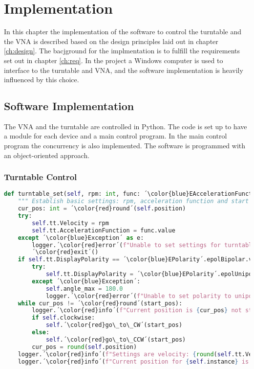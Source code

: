 \chapter{Implementation} \label{ch:implementation}
In this chapter the implementation of the software to control the turntable and the VNA is described based on the design principles laid out in chapter \ref{ch:design}. The bacjground for the implmentation is to fulfill the requirements set out in chapter \ref{ch:req}. In the project a Windows computer is used to interface to the turntable and VNA, and the software implementation is heavily influenced by this choice.

\section{Software Implementation}
The VNA and the turntable are controlled in Python. The code is set up to have a module for each device and a main control program. In the main control program the concurrency is also implemented. The software is programmed with an object-oriented approach.

\subsection{Turntable Control}


\begin{lstlisting}[language=Python, caption=Method to establish settings for turntable and reach start position.]
def turntable_set(self, rpm: int, func: ´\color{blue}EAccelerationFunction´, start_pos: float) -> None:
    """ Establish basic settings: rpm, acceleration function and start position. """
    cur_pos: int = ´\color{red}round´(self.position)
    try:
        self.tt.Velocity = rpm
        self.tt.AccelerationFunction = func.value
    except ´\color{blue}Exception´ as e:
        logger.´\color{red}error´(f"Unable to set settings for turntable {self.instance}, exiting with error code {e}.")
        ´\color{red}exit´()
    if self.tt.DisplayPolarity == ´\color{blue}EPolarity´.epolBipolar.value:
        try:
            self.tt.DisplayPolarity = ´\color{blue}EPolarity´.epolUnipolar.value
        except ´\color{blue}Exception´:
            self.angle_max = 180.0
            logger.´\color{red}error´(f"Unable to set polarity to unipolar for turntable {self.instance}.")
    while cur_pos != ´\color{red}round´(start_pos):
        logger.´\color{red}info´(f"Current position is {cur_pos} not start position {round(start_pos)}. Moving {self.instance} to start position.")
        if self.clockwise:
            self.´\color{red}go\_to\_CW´(start_pos)
        else:
            self.´\color{red}go\_to\_CCW´(start_pos)
        cur_pos = round(self.position)
    logger.´\color{red}info´(f"Settings are velocity: {round(self.tt.Velocity)}, function: {EAccelerationFunction(self.tt.AccelerationFunction)}.")
    logger.´\color{red}info´(f"Current position for {self.instance} is {cur_pos}.")
\end{lstlisting}

